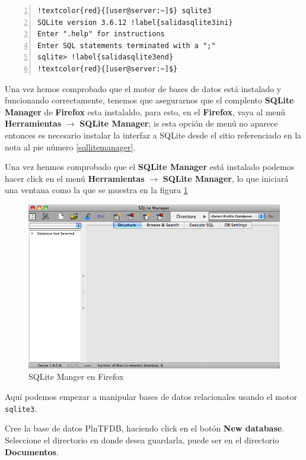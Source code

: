 \documentclass[letter,11pt]{book}
\begin{document}
\begin{Verbatim}[commandchars=!\{\},numbers=left,firstnumber=last,label=Ejecutando sqlite3,frame=topline,fontsize=\scriptsize]
!textcolor{red}{[user@server:~]$} sqlite3
SQLite version 3.6.12 !label{salidasqlite3ini}
Enter ".help" for instructions
Enter SQL statements terminated with a ";"
sqlite> !label{salidasqlite3end}
!textcolor{red}{[user@server:~]$} 
\end{Verbatim} 

Una vez hemos comprobado que el motor de bases de datos está instalado y funcionando correctamente, tenemos que asegurarnos que el complento \textbf{SQLite Manager} de \textbf{Firefox} esta instalaldo, para esto, en el \textbf{Firefox}, vaya al menú \textbf{Herramientas} $\to$ \textbf{SQLite Manager}; is esta opción de menú no aparece entonces es necesario instalar la interfaz a SQLite desde el sitio referenciado en la nota al pie número \ref{sqllitemanager}.

Una vez henmos comprobado que el \textbf{SQLite Manager} está instalado podemos hacer click en el menú \textbf{Herramientas} $\to$ \textbf{SQLite Manager}, lo que iniciará una ventana como la que se muestra en la figura \ref{sqlitemanagerrunning}

\begin{figure}[ht]
\centering
   \includegraphics[width=15cm]{Figs/sqlitemanager.png}
  \caption{\label{sqlitemanagerrunning}SQLite Manger en Firefox}
\end{figure}

Aquí podemos empezar a manipular bases de datos relacionales usando el motor \Verb+sqlite3+.

Cree la base de datos PlnTFDB, haciendo click en el botón \textbf{New database}. Seleccione el directorio en donde desea guardarla, puede ser en el directorio \textbf{Documentos}.
\end{document}
